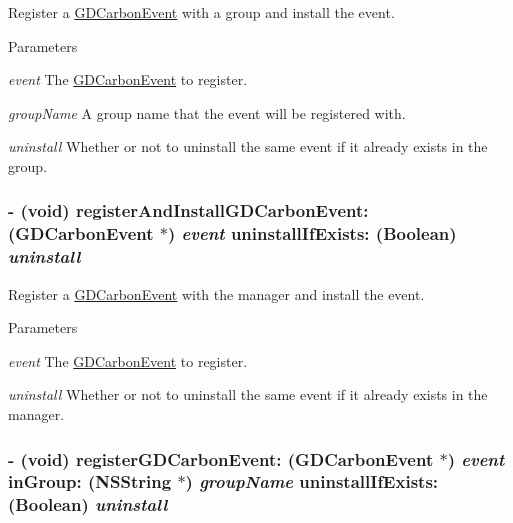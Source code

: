 Register a \hyperlink{interface_g_d_carbon_event}{GDCarbonEvent} with a group and install the event. 
\begin{DoxyParams}{Parameters}
\item[{\em event}]The \hyperlink{interface_g_d_carbon_event}{GDCarbonEvent} to register. \item[{\em groupName}]A group name that the event will be registered with. \item[{\em uninstall}]Whether or not to uninstall the same event if it already exists in the group. \end{DoxyParams}
\hypertarget{interface_g_d_carbon_event_manager_ab5c5be29227c0ac1ff709cf46bb44246}{
\subsubsection[{registerAndInstallGDCarbonEvent:uninstallIfExists:}]{\setlength{\rightskip}{0pt plus 5cm}-\/ (void) registerAndInstallGDCarbonEvent: ({\bf GDCarbonEvent} $\ast$) {\em event}\/ uninstallIfExists: (Boolean) {\em uninstall}}}
\label{interface_g_d_carbon_event_manager_ab5c5be29227c0ac1ff709cf46bb44246}


Register a \hyperlink{interface_g_d_carbon_event}{GDCarbonEvent} with the manager and install the event. 
\begin{DoxyParams}{Parameters}
\item[{\em event}]The \hyperlink{interface_g_d_carbon_event}{GDCarbonEvent} to register. \item[{\em uninstall}]Whether or not to uninstall the same event if it already exists in the manager. \end{DoxyParams}
\hypertarget{interface_g_d_carbon_event_manager_ac96cda5cbfaed699354a96a76b2e0fcd}{
\subsubsection[{registerGDCarbonEvent:inGroup:uninstallIfExists:}]{\setlength{\rightskip}{0pt plus 5cm}-\/ (void) registerGDCarbonEvent: ({\bf GDCarbonEvent} $\ast$) {\em event}\/ inGroup: (NSString $\ast$) {\em groupName}\/ uninstallIfExists: (Boolean) {\em uninstall}}}
\label{interface_g_d_carbon_event_manager_ac96cda5cbfaed699354a96a76b2e0fcd}


